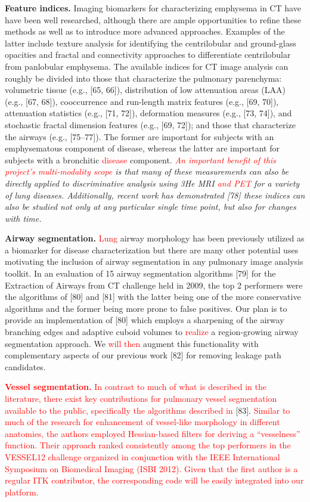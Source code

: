 \documentclass[11pt,]{article}
\begin{document}
\textbf{Feature indices.} Imaging biomarkers for characterizing
emphysema in CT have have been well researched, although there are ample
opportunities to refine these methods as well as to introduce more
advanced approaches. Examples of the latter include texture analysis for
identifying the centrilobular and ground-glass opacities and fractal and
connectivity approaches to differentiate centrilobular from panlobular
emphysema. The available indices for CT image analysis can roughly be
divided into those that characterize the pulmonary parenchyma:
volumetric tissue (e.g., {[}65, 66{]}), distribution of low attenuation
areas (LAA) (e.g., {[}67, 68{]}), cooccurrence and run-length matrix
features (e.g., {[}69, 70{]}), attenuation statistics (e.g., {[}71,
72{]}), deformation measures (e.g., {[}73, 74{]}), and stochastic
fractal dimension features (e.g., {[}69, 72{]}); and those that
characterize the airways (e.g., {[}75--77{]}). The former are important
for subjects with an emphysematous component of disease, whereas the
latter are important for subjects with a bronchitic
\textcolor{red}{disease} component.
\emph{\textcolor{red}{An important benefit of this
project's multi-modality scope} is that many of these measurements can
also be directly applied to discriminative analysis using 3He MRI
\textcolor{red}{and PET} for a variety of lung diseases. Additionally,
recent work has demonstrated {[}78{]} these indices can also be studied
not only at any particular single time point, but also for changes with
time.}

\textbf{Airway segmentation.} \textcolor{red}{Lung} airway morphology
has been previously utilized as a biomarker for disease characterization
but there are many other potential uses motivating the inclusion of
airway segmentation in any pulmonary image analysis toolkit. In an
evaluation of 15 airway segmentation algorithms {[}79{]} for the
Extraction of Airways from CT challenge held in 2009, the top 2
performers were the algorithms of {[}80{]} and {[}81{]} with the latter
being one of the more conservative algorithms and the former being more
prone to false positives. Our plan is to provide an implementation of
{[}80{]} which employs a sharpening of the airway branching edges and
adaptive cuboid volumes to \textcolor{red}{realize} a region-growing
airway segmentation approach. We \textcolor{red}{will then} augment this
functionality with complementary aspects of our previous work {[}82{]}
for removing leakage path candidates.

\textbf{\textcolor{red}{Vessel segmentation.}}
\textcolor{red}{In contrast to much of what is described in the literature, there exist
key contributions for pulmonary vessel segmentation available to the public, specifically
the algorithms described in} {[}83{]}.
\textcolor{red}{Similar to much of the
research for enhancement of vessel-like morphology in different anatomies, the authors
employed Hessian-based filters for deriving a ``vesselness'' function.
Their approach ranked consistently among the top performers in the
VESSEL12 challenge organized in conjunction with the IEEE International Symposium on
Biomedical Imaging (ISBI 2012).  Given that the first author is a regular
ITK contributor, the corresponding code will be easily integrated into our platform.
}
\end{document}
